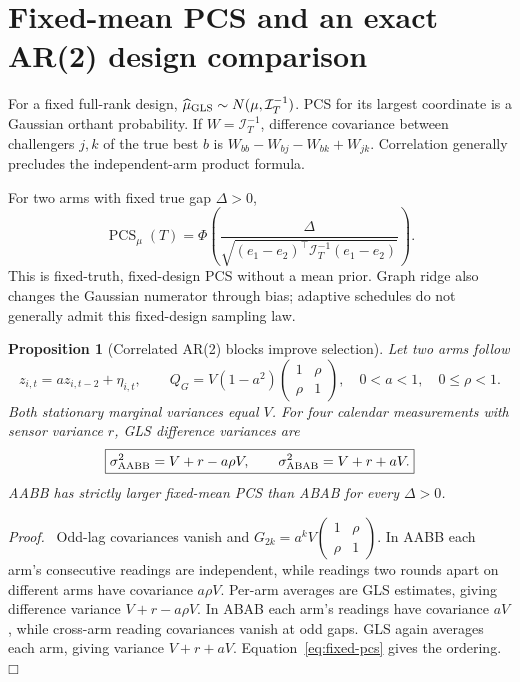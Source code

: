 \documentclass[11pt]{article}
\newtheorem{proposition}[theorem]{Proposition}
\newenvironment{proof}{\par\noindent\textit{Proof.}\ }{\hfill$\mdlgwhtsquare$\par\medskip}
\newcommand{\PCS}{\operatorname{PCS}}
\begin{document}



\section{Fixed-mean PCS and an exact AR(2) design comparison}
For a fixed full-rank design, $\widehat\mu_{\rm GLS}\sim N(\mu,\mathcal I_T^{-1})$. PCS for its largest coordinate is a Gaussian orthant probability. If $W=\mathcal I_T^{-1}$, difference covariance between challengers $j,k$ of the true best $b$ is $W_{bb}-W_{bj}-W_{bk}+W_{jk}$. Correlation generally precludes the independent-arm product formula.

For two arms with fixed true gap $\Delta>0$,
\begin{equation}
\boxed{\PCS_\mu(T)=\Phi\left(
\frac{\Delta}{\sqrt{(e_1-e_2)^\top\mathcal I_T^{-1}(e_1-e_2)}}\right).}
\label{eq:fixed-pcs}
\end{equation}
This is fixed-truth, fixed-design PCS without a mean prior. Graph ridge also changes the Gaussian numerator through bias; adaptive schedules do not generally admit this fixed-design sampling law.

\begin{proposition}[Correlated AR(2) blocks improve selection]
Let two arms follow
\begin{equation}
z_{i,t}=a z_{i,t-2}+\eta_{i,t},\qquad
Q_G=V(1-a^2)\begin{pmatrix}1&\rho\\\rho&1\end{pmatrix},
\quad0<a<1,\quad0\le\rho<1.
\label{eq:lag-two}
\end{equation}
Both stationary marginal variances equal $V$. For four calendar measurements with sensor variance $r$, GLS difference variances are
\begin{equation}
\boxed{\sigma^2_{\rm AABB}=V+r-a\rho V,\qquad
\sigma^2_{\rm ABAB}=V+r+aV.}
\label{eq:design-variance}
\end{equation}
AABB has strictly larger fixed-mean PCS than ABAB for every $\Delta>0$.
\end{proposition}
\begin{proof}
Odd-lag covariances vanish and $G_{2k}=a^kV\begin{pmatrix}1&\rho\\\rho&1\end{pmatrix}$. In AABB each arm's consecutive readings are independent, while readings two rounds apart on different arms have covariance $a\rho V$. Per-arm averages are GLS estimates, giving difference variance $V+r-a\rho V$. In ABAB each arm's readings have covariance $aV$, while cross-arm reading covariances vanish at odd gaps. GLS again averages each arm, giving variance $V+r+aV$. Equation~\eqref{eq:fixed-pcs} gives the ordering.
\end{proof}
\end{document}
